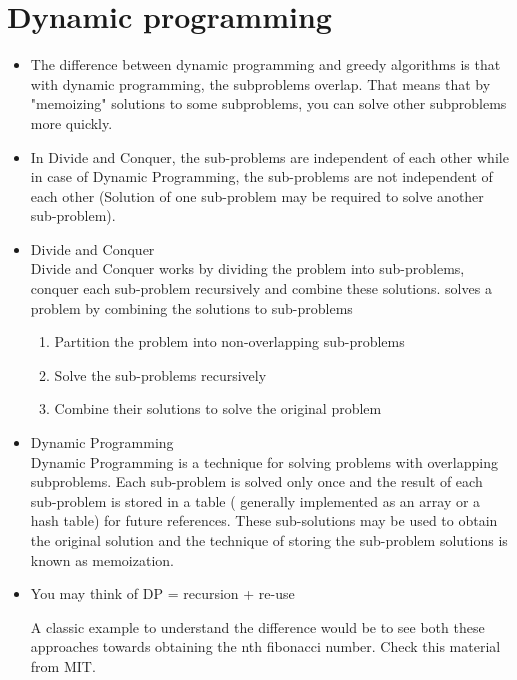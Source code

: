 \documentclass[a4paper,12pt,twoside]{book}
\begin{document}
\section{Dynamic programming}
\begin{itemize}
\item The difference between dynamic programming and greedy algorithms is that with dynamic programming, the subproblems overlap. That means that by "memoizing" solutions to some subproblems, you can solve other subproblems more quickly.   

\item In Divide and Conquer, the sub-problems are independent of each other while in case of Dynamic Programming, the sub-problems are not independent of each other (Solution of one sub-problem may be required to solve another sub-problem).

\item Divide and Conquer \\

Divide and Conquer works by dividing the problem into sub-problems, conquer each sub-problem recursively and combine these solutions. solves a problem by combining the solutions to  sub-problems

\begin{enumerate}
\item Partition the problem into non-overlapping sub-problems
\item Solve the sub-problems recursively
\item Combine their solutions to solve the original problem

\end{enumerate}



\item Dynamic Programming \\

Dynamic Programming is a technique for solving problems with overlapping subproblems. Each sub-problem is solved only once and the result of each sub-problem is stored in a table ( generally implemented as an array or a hash table) for future references. These sub-solutions may be used to obtain the original solution and the technique of storing the sub-problem solutions is known as memoization.

\item You may think of DP = recursion + re-use

A classic example to understand the difference would be to see both these approaches towards obtaining the nth fibonacci number. Check this material from MIT.


\end{itemize}
\end{document}
